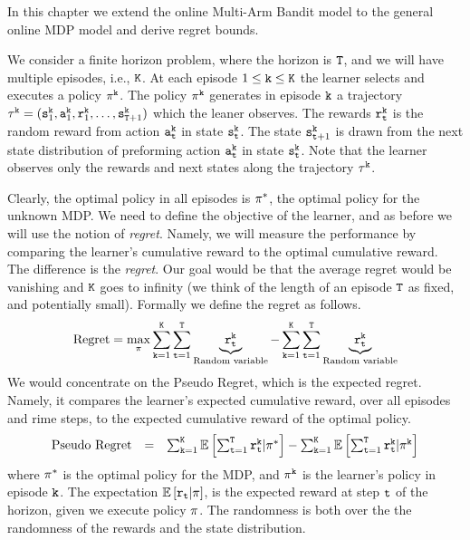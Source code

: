 
In this chapter we extend the online Multi-Arm Bandit model to the general online MDP model and derive regret bounds.

We consider a finite horizon problem, where the horizon is ${\tt T}$, and we will have multiple episodes, i.e., ${\tt K}$. 
At each episode $1\leq {\tt k}\leq {\tt K}$ the learner selects and executes a policy $\pi^{\tt k}$. The policy $\pi^{\tt k}$ generates in episode ${\tt k}$ a trajectory 
$\tau^{\tt k}=({\tt s}^{\tt k}_1, {\tt a}^{\tt k}_1,{\tt r}^{\tt k}_1, \ldots, {\tt s}^{\tt k}_{{\tt T}+1})$ 
which the leaner observes. The rewards ${\tt r}^{\tt k}_{\tt t}$ is the random reward from action ${\tt a}^{\tt k}_{\tt t}$ in state ${\tt s}^{\tt k}_{\tt t}$. The state ${\tt s}^{\tt k}_{{\tt t}+1}$ is drawn from the next state distribution of preforming action ${\tt a}^{\tt k}_{\tt t}$ in state ${\tt s}^{\tt k}_{\tt t}$. Note that the learner observes only the rewards and next states along the trajectory $\tau^{\tt k}$.

Clearly, the optimal policy in all episodes is $\pi^*$, the optimal policy for the unknown MDP.
We need to define the objective of the learner, and as before we will use the notion of \emph{regret}. Namely, we will measure the performance by comparing the learner's cumulative reward to the optimal cumulative reward. The difference is the \emph{regret}. Our goal would be that the average regret would be vanishing and ${\tt K}$ goes to infinity (we think of the length of an episode ${\tt T}$ as fixed, and potentially small).
Formally we define the regret as follows.
\[
\text{Regret}=\max_{\pi}
\sum_{{\tt k}=1}^{{\tt K}}\sum_{{\tt t}=1}^{{\tt T}}\underbrace{{\tt r}^{{\tt k}}_{{\tt t}}}_{\text{Random variable}}-
\sum_{{\tt k}=1}^{{\tt K}}\sum_{{\tt t}=1}^{{\tt T}}\underbrace{{\tt r}^{{\tt k}}_{{\tt t}}}_{\text{Random variable}}
\]
We would concentrate on the Pseudo Regret, which is the expected regret. Namely, it  compares the learner's expected cumulative reward, over all episodes and rime steps, to the  expected cumulative reward of the optimal policy. 
\[
\begin{array}{ccc}
\text{Pseudo Regret} & = & \sum_{{\tt k}=1}^{{\tt K}}\mathbb{E}\left[ \sum_{{\tt t}=1}^{{\tt T}}{\tt r}^{\tt k}_{{\tt t}}| \pi^*\right]-\sum_{{\tt k}=1}^{{\tt K}}\mathbb{E}\left[ \sum_{{\tt t}=1}^{{\tt T}}{\tt r}_{{\tt t}}^{\tt k}|\pi^{\tt k}\right]
\end{array}
\]
where $\pi^*$ is the optimal policy for the MDP, and $\pi^{\tt k}$ is the learner's policy in episode ${\tt k}$.
The expectation $\mathbb{E}\left[{\tt r}_{{\tt t}}| \pi\right]$, is the expected reward at step ${\tt t}$ of the horizon, given we execute policy $\pi$. The randomness is both over the the randomness of the rewards and the state distribution.

